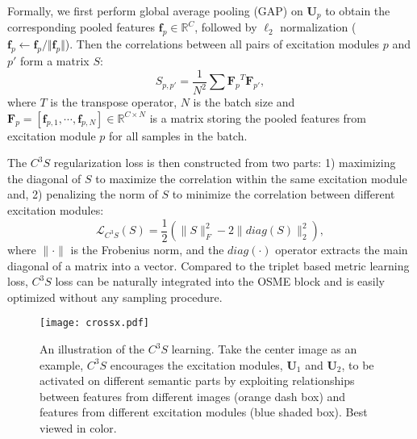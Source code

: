 \documentclass[10pt,twocolumn,letterpaper]{article}
\begin{document}
Formally, we first perform global average pooling (GAP) on $\mathbf{U}_p$ to obtain the corresponding pooled features $\mathbf{f}_p\in\mathbb{R}^C$, followed by $\ell_2$ normalization ($\mathbf{f}_p\leftarrow\mathbf{f}_p/\Vert\mathbf{f}_p\Vert$). Then the correlations between all pairs of excitation modules $p$ and $p'$ form a matrix $S$:
\begin{equation}
\label{eq:cs}
S_{p,p'} = \frac{1}{N^2}\sum {\mathbf{F}_p}^T \mathbf{F}_{p'}, 
\end{equation}
where $T$ is the transpose operator, $N$ is the batch size and $\mathbf{F}_p = [\mathbf{f}_{p,1}, \cdots, \mathbf{f}_{p,N}] \in \mathbb{R}^{C\times N}$ is a matrix storing the pooled features from excitation module $p$ for all samples in the batch. 

The $C^3S$ regularization loss is then constructed from two parts: 1) maximizing the diagonal of $S$ to maximize the correlation within the same excitation module and, 2) penalizing the norm of $S$ to minimize the correlation between different excitation modules:
\begin{equation}
\label{seq:c3sreg}
\mathcal{L}_{C^3S}(S) = \frac{1}{2}\left (\|S\|_F^2 - 2 \|diag(S)\|_2^2\right ),
\end{equation}
where $\|\cdot\|$ is the Frobenius norm, and the $diag(\cdot)$ operator extracts the main diagonal of a matrix into a vector. 
Compared to the triplet based metric learning loss, $C^3S$ loss can be naturally integrated into the OSME block and is easily optimized without any sampling procedure.

\begin{figure}[t]
\begin{center}
   \texttt{[image: crossx.pdf]}
\end{center}
   \caption{An illustration of the $C^3S$ learning. Take the center image as an example, $C^3S$ encourages the excitation modules, $\mathbf{U}_1$ and $\mathbf{U}_2$, to be activated on different semantic parts by exploiting relationships between features from different images (orange dash box) and features from different excitation modules (blue shaded box). Best viewed in color.}
\label{fig:c3s}
\end{figure}
\end{document}
